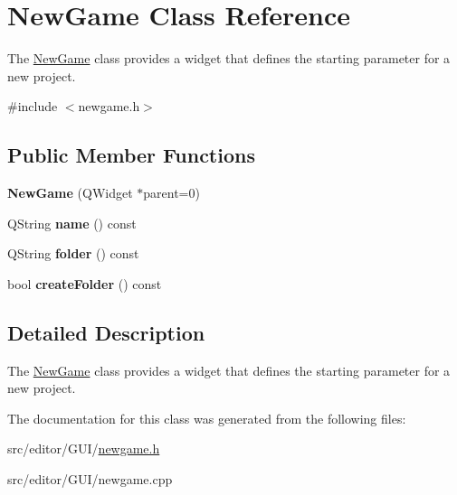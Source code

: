 \hypertarget{class_new_game}{\section{\-New\-Game \-Class \-Reference}
\label{class_new_game}
}


\-The \hyperlink{class_new_game}{\-New\-Game} class provides a widget that defines the starting parameter for a new project.  




{\ttfamily \#include $<$newgame.\-h$>$}

\subsection*{\-Public \-Member \-Functions}
\begin{DoxyCompactItemize}
\item 
\hypertarget{class_new_game_abc0dccbe2a43eef32570473265de9a8a}{{\bfseries \-New\-Game} (\-Q\-Widget $\ast$parent=0)}\label{class_new_game_abc0dccbe2a43eef32570473265de9a8a}

\item 
\hypertarget{class_new_game_a7fd556a28c38e6c1c46ea227acad99bd}{\-Q\-String {\bfseries name} () const }\label{class_new_game_a7fd556a28c38e6c1c46ea227acad99bd}

\item 
\hypertarget{class_new_game_ae53e79a27fdd2b0610f5f98500f299cb}{\-Q\-String {\bfseries folder} () const }\label{class_new_game_ae53e79a27fdd2b0610f5f98500f299cb}

\item 
\hypertarget{class_new_game_a5f883cc09386cca3247acac873a36777}{bool {\bfseries create\-Folder} () const }\label{class_new_game_a5f883cc09386cca3247acac873a36777}

\end{DoxyCompactItemize}


\subsection{\-Detailed \-Description}
\-The \hyperlink{class_new_game}{\-New\-Game} class provides a widget that defines the starting parameter for a new project. 

\-The documentation for this class was generated from the following files\-:\begin{DoxyCompactItemize}
\item 
src/editor/\-G\-U\-I/\hyperlink{newgame_8h}{newgame.\-h}\item 
src/editor/\-G\-U\-I/newgame.\-cpp\end{DoxyCompactItemize}
